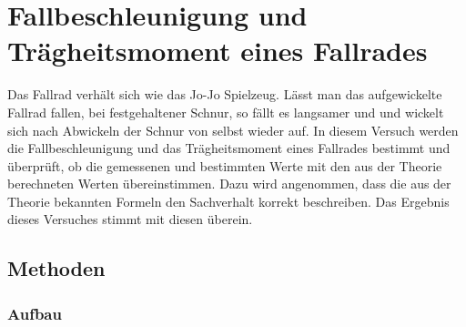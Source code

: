 \section{Fallbeschleunigung und Trägheitsmoment eines Fallrades} 

	Das Fallrad verhält sich wie das Jo-Jo Spielzeug. Lässt man das aufgewickelte Fallrad fallen, bei festgehaltener Schnur, so fällt es langsamer und und wickelt sich nach Abwickeln der Schnur von selbst wieder auf. In diesem Versuch werden die Fallbeschleunigung und das Trägheitsmoment eines Fallrades bestimmt und überprüft, ob die gemessenen und bestimmten Werte mit den aus der Theorie berechneten Werten übereinstimmen. Dazu wird angenommen, dass die aus der Theorie bekannten Formeln den Sachverhalt korrekt beschreiben. Das Ergebnis dieses Versuches stimmt mit diesen überein. 
	
	\subsection{Methoden}
		
		\subsubsection{Aufbau}
		

